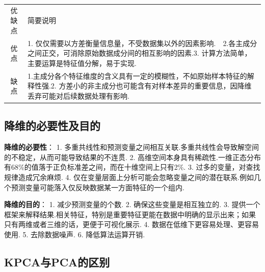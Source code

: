\begin{longtable}[]{ cl }
\begin{minipage}[b]{0.05\columnwidth}\centering\strut
优缺点\strut
\end{minipage} & \begin{minipage}[b]{0.04\columnwidth}\raggedright\strut
简要说明\strut
\end{minipage}\tabularnewline
\begin{minipage}[t]{0.05\columnwidth}\centering\strut
优点\strut
\end{minipage} & \begin{minipage}[t]{0.04\columnwidth}\raggedright\strut
1.
仅仅需要以方差衡量信息量，不受数据集以外的因素影响.　2.各主成分之间正交，可消除原始数据成分间的相互影响的因素.3.
计算方法简单，主要运算是特征值分解，易于实现.\strut
\end{minipage}\tabularnewline
\begin{minipage}[t]{0.05\columnwidth}\centering\strut
缺点\strut
\end{minipage} & \begin{minipage}[t]{0.04\columnwidth}\raggedright\strut
1.主成分各个特征维度的含义具有一定的模糊性，不如原始样本特征的解释性强.2.
方差小的非主成分也可能含有对样本差异的重要信息，因降维丢弃可能对后续数据处理有影响.\strut
\end{minipage}\tabularnewline
\end{longtable}

\subsection{降维的必要性及目的}\label{ux964dux7ef4ux7684ux5fc5ux8981ux6027ux53caux76eeux7684}

\textbf{降维的必要性}： 1.
多重共线性和预测变量之间相互关联.多重共线性会导致解空间的不稳定，从而可能导致结果的不连贯.
2.
高维空间本身具有稀疏性.一维正态分布有68\%的值落于正负标准差之间，而在十维空间上只有2\%.
3. 过多的变量，对查找规律造成冗余麻烦. 4.
仅在变量层面上分析可能会忽略变量之间的潜在联系.例如几个预测变量可能落入仅反映数据某一方面特征的一个组内.

\textbf{降维的目的}： 1. 减少预测变量的个数. 2.
确保这些变量是相互独立的. 3.
提供一个框架来解释结果.相关特征，特别是重要特征更能在数据中明确的显示出来；如果只有两维或者三维的话，更便于可视化展示.
4. 数据在低维下更容易处理、更容易使用. 5. 去除数据噪声. 6.
降低算法运算开销.

\subsection{KPCA与PCA的区别}\label{kpcaux4e0epcaux7684ux533aux522b}


